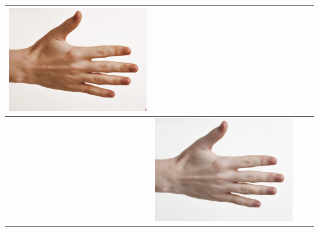 \begin{longtable}{|N||c|c|c|}
\begin{minipage}{.29\textwidth}
    \includegraphics[width=\textwidth,height=\textheight,keepaspectratio]{../rc_test/outputs/20170516_proportional_test/hand_pale_to_hand_brown.jpg}
  \end{minipage} \\
\hline  \label{row:prop_test_hand_pale_to_hand_light} &
  \begin{minipage}{.29\textwidth}
    \includegraphics[width=\textwidth,height=\textheight,keepaspectratio]{../inputs/hand_pale.jpg}
  \end{minipage} & 
  \begin{minipage}{.29\textwidth}

\end{minipage}
\end{longtable}

